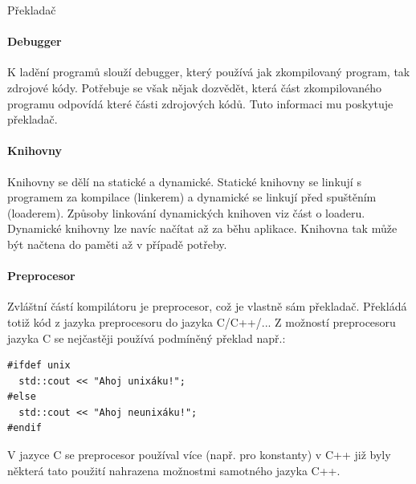 \begin{definiceN}{Překladač}
\paragraph{Debugger}
K ladění programů slouží debugger, který používá jak zkompilovaný program, tak zdrojové kódy. Potřebuje se však nějak dozvědět, která část zkompilovaného programu odpovídá které části zdrojových kódů. Tuto informaci mu poskytuje překladač.

\paragraph{Knihovny}
Knihovny se dělí na statické a dynamické. Statické knihovny se linkují s programem za kompilace (linkerem) a dynamické se linkují před spuštěním (loaderem). Způsoby linkování dynamických knihoven viz část o loaderu. Dynamické knihovny lze navíc načítat až za běhu aplikace. Knihovna tak může být načtena do paměti až v případě potřeby.

\paragraph{Preprocesor}
Zvláštní částí kompilátoru je preprocesor, což je vlastně sám překladač. Překládá totiž kód z jazyka preprocesoru do jazyka C/C++/... Z možností preprocesoru jazyka C se nejčastěji používá podmíněný překlad např.:
\begin{verbatim}
#ifdef unix
  std::cout << "Ahoj unixáku!";
#else
  std::cout << "Ahoj neunixáku!";
#endif
\end{verbatim}
V jazyce C se preprocesor používal více (např. pro konstanty) v C++ již byly některá tato použití nahrazena možnostmi samotného jazyka C++.



\end{definiceN}
